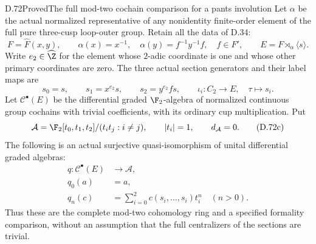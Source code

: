 \begin{claim}{D.72}{Proved}{The full mod-two cochain comparison for a pants involution}
Let $\alpha$ be the actual normalized representative of any
nonidentity finite-order element of the full pure three-cusp
loop-outer group. Retain all the data of D.34:
\[
 F=\widehat F(x,y),\qquad
 \alpha(x)=x^{-1},\quad \alpha(y)=f^{-1}y^{-1}f,
 \quad f\in F',\qquad E=F\rtimes_\alpha\langle s\rangle.
                                                               \tag{D.72a}
\]
Write $e_2\in\widehat\Z$ for the element whose $2$-adic
coordinate is one and whose other primary coordinates are zero.
The three actual section generators and their label maps are
\[
 s_0=s,\qquad s_1=x^{e_2}s,\qquad s_2=y^{e_2}fs,
 \qquad \iota_i:C_2\longrightarrow E,\quad\tau\longmapsto s_i.
                                                               \tag{D.72b}
\]
Let $\mathcal C^\bullet(E)$ be the differential graded
$\F_2$-algebra of normalized continuous group cochains with
trivial coefficients, with its ordinary cup multiplication.
Put
\[
 \mathcal A=\F_2[t_0,t_1,t_2]/(t_it_j:i\ne j),
              \qquad |t_i|=1,\qquad d_{\mathcal A}=0.
                                                               \tag{D.72c}
\]
The following is an actual surjective quasi-isomorphism of
unital differential graded algebras:
\[
 \begin{split}
 q:\mathcal C^\bullet(E)&\longrightarrow\mathcal A,\\
 q_0(a)&=a,\\
 q_n(c)&=\sum_{i=0}^2 c(s_i,\ldots,s_i)t_i^n
                                      \quad(n>0).
 \end{split}                                                   \tag{D.72d}
\]
Thus these are the complete mod-two cohomology ring and a
specified formality comparison, without an assumption that
the full centralizers of the sections are trivial.


\end{claim}
